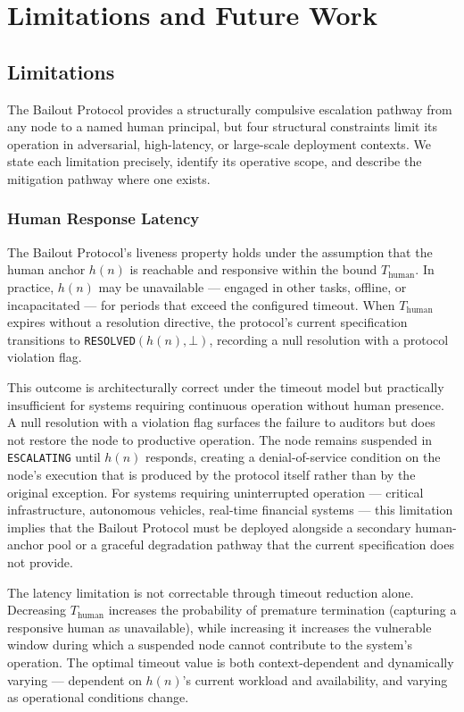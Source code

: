 \section{Limitations and Future Work}\label{sec:limitations}

\subsection{Limitations}

The Bailout Protocol provides a structurally compulsive escalation pathway from any \bxthree{} node to a named human principal, but four structural constraints limit its operation in adversarial, high-latency, or large-scale deployment contexts. We state each limitation precisely, identify its operative scope, and describe the mitigation pathway where one exists.

\subsubsection{Human Response Latency}

The Bailout Protocol's liveness property holds under the assumption that the human anchor $h(n)$ is reachable and responsive within the bound $T_{\text{human}}$. In practice, $h(n)$ may be unavailable --- engaged in other tasks, offline, or incapacitated --- for periods that exceed the configured timeout. When $T_{\text{human}}$ expires without a resolution directive, the protocol's current specification transitions to \texttt{RESOLVED}$(h(n), \bot)$, recording a null resolution with a protocol violation flag.

This outcome is architecturally correct under the timeout model but practically insufficient for systems requiring continuous operation without human presence. A null resolution with a violation flag surfaces the failure to auditors but does not restore the node to productive operation. The node remains suspended in \texttt{ESCALATING} until $h(n)$ responds, creating a denial-of-service condition on the node's execution that is produced by the protocol itself rather than by the original exception. For systems requiring uninterrupted operation --- critical infrastructure, autonomous vehicles, real-time financial systems --- this limitation implies that the Bailout Protocol must be deployed alongside a secondary human-anchor pool or a graceful degradation pathway that the current specification does not provide.

The latency limitation is not correctable through timeout reduction alone. Decreasing $T_{\text{human}}$ increases the probability of premature termination (capturing a responsive human as unavailable), while increasing it increases the vulnerable window during which a suspended node cannot contribute to the system's operation. The optimal timeout value is both context-dependent and dynamically varying --- dependent on $h(n)$'s current workload and availability, and varying as operational conditions change.

